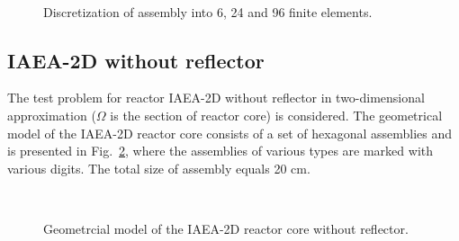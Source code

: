 \documentclass[authoryear]{elsarticle}
\begin{document}
\begin{figure}[htp]
\begin{minipage}{0.30\linewidth}
	\end{minipage}
	\hfill
	\begin{minipage}{0.30\linewidth}
		\\
	\end{minipage}
	\caption{Discretization of assembly into 6, 24 and 96 finite elements.}
	\label{fig:mesh}
\end{figure}

\subsection{IAEA-2D without reflector}
The test problem for reactor IAEA-2D without reflector \citep{chao1995} in two-dimensional approximation ($\Omega$ is the section of reactor core) is considered.
The geometrical model of the IAEA-2D reactor core consists of a set of hexagonal assemblies and is presented in Fig.~\ref{fig:iaea}, where the assemblies of various types are marked with various digits. 
The total size of assembly equals 20 cm. 

\begin{figure}[htp]
	\\
	\caption{Geometrcial model of the IAEA-2D reactor core without reflector.}
	\label{fig:iaea}
\end{figure}
\end{document}
